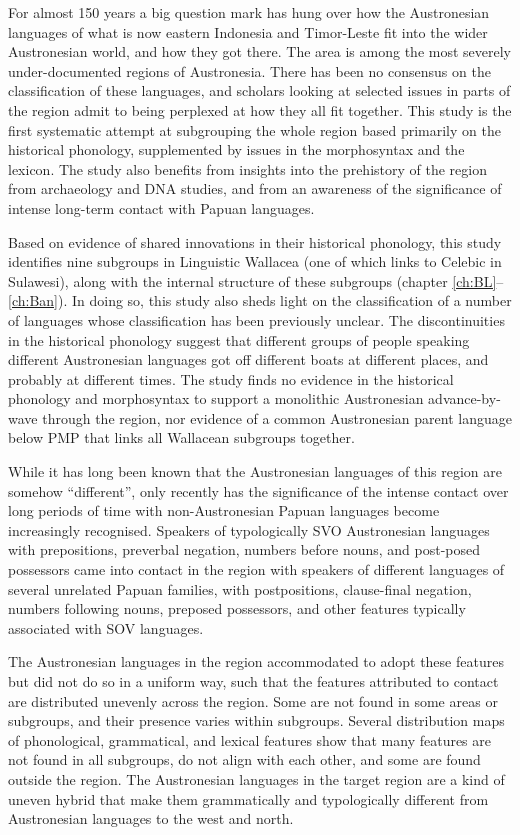 For almost 150 years a big question mark has hung over
how the Austronesian languages of what is now eastern Indonesia
and Timor-Leste fit into the wider Austronesian world,
and how they got there.
The area is among the most severely under-documented regions of Austronesia.
There has been no consensus on the classification of these languages,
and scholars looking at selected issues in parts of the region
admit to being perplexed at how they all fit together.
This study is the first systematic attempt at subgrouping
the whole region based primarily on the historical phonology,
supplemented by issues in the morphosyntax
and the lexicon.
The study also benefits from insights into the
prehistory of the region from archaeology
and DNA studies,
and from an awareness of the significance of
intense long-term contact with Papuan languages.

Based on evidence of shared innovations in their historical phonology,
this study identifies nine subgroups in Linguistic Wallacea (one of which links to Celebic in Sulawesi),
along with the internal structure of these subgroups (chapter \ref{ch:BL}--\ref{ch:Ban}).
In doing so,
this study also sheds light on the classification of a number of languages whose classification has been previously unclear.
The discontinuities in the historical phonology suggest that different groups
of people speaking different Austronesian languages got off different boats at different places,
and probably at different times.
The study finds no evidence in the historical phonology
and morphosyntax to support a monolithic Austronesian advance-by-wave through the region,
nor evidence of a common Austronesian parent language below PMP
that links all Wallacean subgroups together.

While it has long been known that the Austronesian languages of this region are somehow “different”,
only recently has the significance of the intense contact over long periods
of time with non-Austronesian Papuan languages become increasingly recognised.
Speakers of typologically SVO Austronesian languages with prepositions,
preverbal negation, numbers before nouns,
and post-posed possessors came into contact in the region with speakers
of different languages of several unrelated Papuan families,
with postpositions, clause-final negation,
numbers following nouns,
preposed possessors, and other features typically associated with SOV languages.

The Austronesian languages in the region accommodated to adopt these features but did not do so in a uniform way,
such that the features attributed to contact are distributed unevenly across the region.
Some are not found in some areas or subgroups,
and their presence varies within subgroups.
Several distribution maps of phonological,
grammatical, and lexical features show that many features are not found in all subgroups,
do not align with each other,
and some are found outside the region.
The Austronesian languages in the target region are a kind of uneven hybrid that make them grammatically
and typologically different from Austronesian languages to the west
and north.


